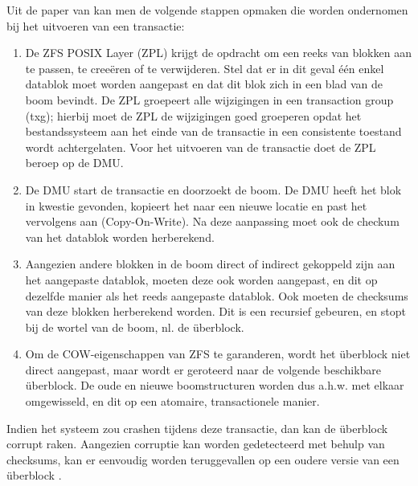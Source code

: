 Uit de paper van \textcite{ZFSBonwick} kan men de volgende stappen opmaken die worden ondernomen bij het uitvoeren van een transactie:

\begin{enumerate}
  \item{De ZFS POSIX Layer (ZPL) krijgt de opdracht om een reeks van blokken aan te passen, te creeëren of te verwijderen. Stel dat er in dit geval één enkel datablok moet worden aangepast en dat dit blok zich in een blad van de boom bevindt. De ZPL groepeert alle wijzigingen in een transaction group (txg); hierbij moet de ZPL de wijzigingen goed groeperen opdat het bestandssysteem aan het einde van de transactie in een consistente toestand wordt achtergelaten. Voor het uitvoeren van de transactie doet de ZPL beroep op de DMU.}
  \item{De DMU start de transactie en doorzoekt de boom. De DMU heeft het blok in kwestie gevonden, kopieert het naar een nieuwe locatie en past het vervolgens aan (Copy-On-Write). Na deze aanpassing moet ook de checkum van het datablok worden herberekend.}
  \item{Aangezien andere blokken in de boom direct of indirect gekoppeld zijn aan het aangepaste datablok, moeten deze ook worden aangepast, en dit op dezelfde manier als het reeds aangepaste datablok. Ook moeten de checksums van deze blokken herberekend worden. Dit is een recursief gebeuren, en stopt bij de wortel van de boom, nl. de \"{u}berblock. }
  \item{Om de COW-eigenschappen van ZFS te garanderen, wordt het \"{u}berblock niet direct aangepast, maar wordt er geroteerd naar de volgende beschikbare \"{u}berblock. De oude en nieuwe boomstructuren worden dus a.h.w. met elkaar omgewisseld, en dit op een atomaire, transactionele manier.}
\end{enumerate}

Indien het systeem zou crashen tijdens deze transactie, dan kan de \"{u}berblock corrupt raken. Aangezien corruptie kan worden gedetecteerd met behulp van checksums, kan er eenvoudig worden teruggevallen op een oudere versie van een \"{u}berblock \autocite{ZFSBonwick}.



